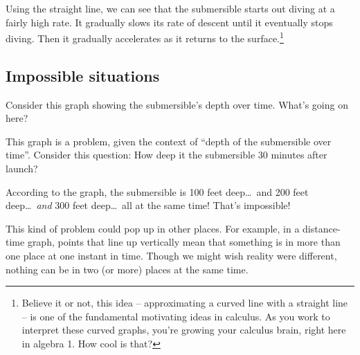 Using the straight line, we can see that the submersible starts out diving at a fairly high rate. It gradually slows its rate of descent until it eventually stops diving. Then it gradually accelerates as it returns to the surface.\footnote{Believe it or not, this idea -- approximating a curved line with a straight line -- is one of the fundamental motivating ideas in calculus. As you work to interpret these curved graphs, you're growing your calculus brain, right here in algebra 1. How cool is that?}

\subsection{Impossible situations}

Consider this graph showing the submersible's depth over time. What's going on here?

\begin{figure}
\end{figure}

This graph is a problem, given the context of ``depth of the submersible over time''. Consider this question: How deep it the submersible 30 minutes after launch?

According to the graph, the submersible is 100 feet deep\ldots\ and 200 feet deep\ldots\ \textit{and} 300 feet deep\ldots\ all at the same time! That's impossible!

This kind of problem could pop up in other places. For example, in a distance-time graph, points that line up vertically mean that something is in more than one place at one instant in time. Though we might wish reality were different, nothing can be in two (or more) places at the same time.

